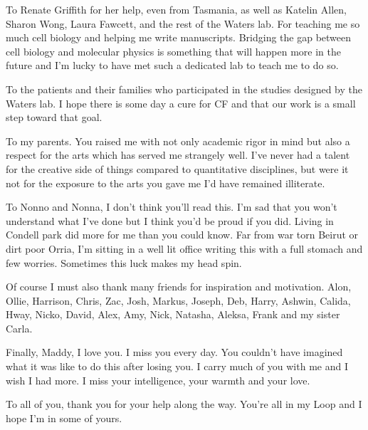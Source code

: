 To Renate Griffith for her help, even from Tasmania, as well as Katelin Allen, Sharon Wong, Laura Fawcett, and the rest of the Waters lab. For teaching me so much cell biology and helping me write manuscripts. Bridging the gap between cell biology and molecular physics is something that will happen more in the future and I'm lucky to have met such a dedicated lab to teach me to do so.

To the patients and their families who participated in the studies designed by the Waters lab. I hope there is some day a cure for CF and that our work is a small step toward that goal.

To my parents. You raised me with not only academic rigor in mind but also a respect for the arts which has served me strangely well. I've never had a talent for the creative side of things compared to quantitative disciplines, but were it not for the exposure to the arts you gave me I'd have remained illiterate. 

To Nonno and Nonna, I don't think you'll read this. I'm sad that you won't understand what I've done but I think you'd be proud if you did. Living in Condell park did more for me than you could know. Far from war torn Beirut or dirt poor Orria, I'm sitting in a well lit office writing this with a full stomach and few worries. Sometimes this luck makes my head spin. 

Of course I must also thank many friends for inspiration and motivation. Alon, Ollie, Harrison, Chris, Zac, Josh, Markus, Joseph, Deb, Harry, Ashwin, Calida, Hway, Nicko, David, Alex, Amy, Nick, Natasha, Aleksa, Frank and my sister Carla.

Finally, Maddy, I love you. I miss you every day. You couldn't have imagined what it was like to do this after losing you. I carry much of you with me and I wish I had more. I miss your intelligence, your warmth and your love.

To all of you, thank you for your help along the way. You're all in my Loop \cite{hofstadter2007} and I hope I'm in some of yours.

